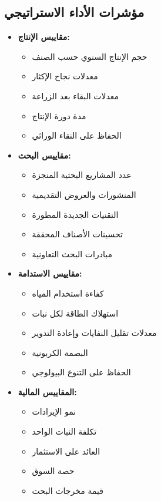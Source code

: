 \subsection{مؤشرات الأداء الاستراتيجي}
\begin{itemize}
    \item \textbf{مقاييس الإنتاج:}
    \begin{itemize}
        \item حجم الإنتاج السنوي حسب الصنف
        \item معدلات نجاح الإكثار
        \item معدلات البقاء بعد الزراعة
        \item مدة دورة الإنتاج
        \item الحفاظ على النقاء الوراثي
    \end{itemize}
    
    \item \textbf{مقاييس البحث:}
    \begin{itemize}
        \item عدد المشاريع البحثية المنجزة
        \item المنشورات والعروض التقديمية
        \item التقنيات الجديدة المطورة
        \item تحسينات الأصناف المحققة
        \item مبادرات البحث التعاونية
    \end{itemize}
    
    \item \textbf{مقاييس الاستدامة:}
    \begin{itemize}
        \item كفاءة استخدام المياه
        \item استهلاك الطاقة لكل نبات
        \item معدلات تقليل النفايات وإعادة التدوير
        \item البصمة الكربونية
        \item الحفاظ على التنوع البيولوجي
    \end{itemize}
    
    \item \textbf{المقاييس المالية:}
    \begin{itemize}
        \item نمو الإيرادات
        \item تكلفة النبات الواحد
        \item العائد على الاستثمار
        \item حصة السوق
        \item قيمة مخرجات البحث
    \end{itemize}
\end{itemize}

